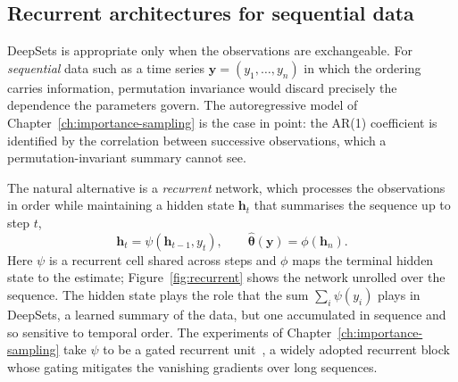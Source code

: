 \subsection{Recurrent architectures for sequential data}
\label{sec:recurrent-arch}

DeepSets is appropriate only when the observations are exchangeable.
For \emph{sequential} data such as a time series $\mathbf{y} = (y_1, \dots,
y_n)$ in which the ordering carries information, permutation
invariance would discard precisely the dependence the parameters
govern. The autoregressive model of
Chapter~\ref{ch:importance-sampling} is the case in point: the AR(1)
coefficient is identified by the correlation between successive
observations, which a permutation-invariant summary cannot see.

The natural alternative is a \emph{recurrent} network, which processes
the observations in order while maintaining a hidden state
$\mathbf{h}_t$ that summarises the sequence up to step $t$,
%
\begin{equation}
  \mathbf{h}_t = \psi(\mathbf{h}_{t-1}, y_t),
  \qquad
  \hat{\bm{\theta}}(\mathbf{y}) = \phi(\mathbf{h}_n).
\end{equation}
%
Here $\psi$ is a recurrent cell shared across steps and $\phi$ maps
the terminal hidden state to the estimate; Figure~\ref{fig:recurrent}
shows the network unrolled over the sequence. The hidden state plays
the role that the sum $\sum_i \psi(y_i)$ plays in DeepSets, a learned
summary of the data, but one accumulated in sequence and so sensitive
to temporal order. The experiments of
Chapter~\ref{ch:importance-sampling} take $\psi$ to be a gated
recurrent unit~\citep{cho2014gru}, a widely adopted recurrent block whose gating mitigates the
vanishing gradients over long sequences.


